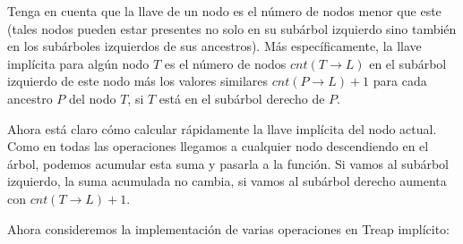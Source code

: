 \documentclass[12pt]{article}
\newcommand{\nl}{\vspace{0.3cm}}
\begin{document}
\nl

Tenga en cuenta que la llave de un nodo es el número de nodos menor que este (tales nodos pueden estar presentes no solo en su subárbol izquierdo sino también en los subárboles izquierdos de sus ancestros). Más específicamente, la llave implícita para algún nodo $T$ es el número de nodos $cnt(T \rightarrow L)$ en el subárbol izquierdo de este nodo más los valores similares $cnt(P \rightarrow L) + 1$ para cada ancestro $P$ del nodo $T$, si $T$ está en el subárbol derecho de $P$.

\nl

Ahora está claro cómo calcular rápidamente la llave implícita del nodo actual. Como en todas las operaciones llegamos a cualquier nodo descendiendo en el árbol, podemos acumular esta suma y pasarla a la función. Si vamos al subárbol izquierdo, la suma acumulada no cambia, si vamos al subárbol derecho aumenta con $cnt(T \rightarrow L) + 1$.

\nl

Ahora consideremos la implementación de varias operaciones en Treap implícito:

\nl
\end{document}

